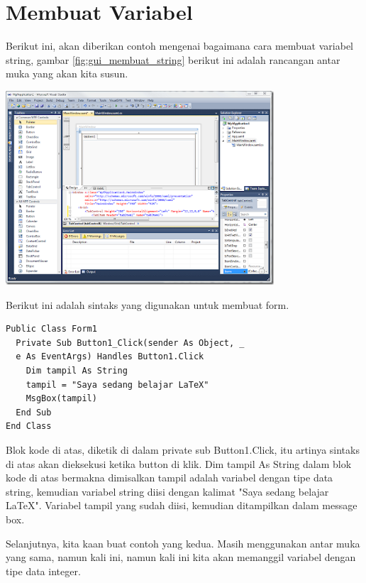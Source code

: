 \documentclass[oneside]{book}
\begin{document}
\section{Membuat Variabel}
Berikut ini, akan diberikan contoh mengenai bagaimana cara membuat variabel string, gambar \ref{fig:gui_membuat_string} berikut ini adalah rancangan antar muka yang akan kita susun.

\vspace{0.5cm}

\begin{minipage}{\linewidth}
  \centering
  \includegraphics[width=10cm]{figures/fig_gui_membuat_form}
  \label{fig:gui_membuat_string}
\end{minipage}

\vspace{0.5cm}

Berikut ini adalah sintaks yang digunakan untuk membuat form.

\begin{verbatim}
Public Class Form1
  Private Sub Button1_Click(sender As Object, _
  e As EventArgs) Handles Button1.Click
    Dim tampil As String
    tampil = "Saya sedang belajar LaTeX"
    MsgBox(tampil)
  End Sub
End Class
\end{verbatim}

Blok kode di atas, diketik di dalam private sub Button1.Click, itu artinya sintaks di atas akan dieksekusi ketika button di klik. Dim tampil As String dalam blok kode di atas bermakna dimisalkan tampil adalah variabel dengan tipe data string, kemudian variabel string diisi dengan kalimat "Saya sedang belajar LaTeX". Variabel tampil yang sudah diisi, kemudian ditampilkan dalam message box.

Selanjutnya, kita kaan buat contoh yang kedua. Masih menggunakan antar muka yang sama, namun kali ini, namun kali ini kita akan memanggil variabel dengan tipe data integer.
\end{document}
